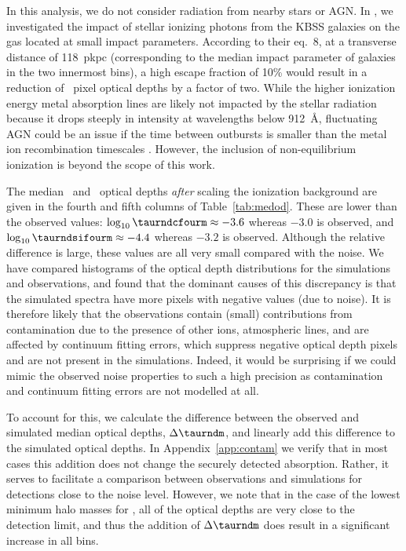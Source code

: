 \documentclass[useAMS,usenatbib,letterpaper]{mn2e}
\begin{document}
In this analysis, we do not consider radiation from 
nearby stars or AGN. In \citet{turner15}, we investigated the impact
of stellar ionizing photons from the KBSS galaxies 
on the gas located at small impact parameters.  According to their eq.~8,
at a transverse distance of 118~pkpc (corresponding to the median impact 
parameter of galaxies in the two innermost bins), 
a high escape fraction of 10\% would result in a reduction of \hone\ pixel optical depths
by a factor of two. While the higher ionization energy metal absorption lines are likely
not impacted by the stellar radiation because it drops steeply in intensity at wavelengths below 912~\AA, 
fluctuating AGN could be an issue if the time between outbursts is smaller than the metal ion 
recombination timescales \citep{oppenheimer13b, segers17}. However, the inclusion
of non-equilibrium ionization is beyond the scope of this work. 

The median \cfour\ and \sifour\ optical depths \textit{after} scaling
the ionization background are given in the fourth and fifth columns 
of Table~\ref{tab:medod}. 
These are lower than the 
observed values:
$\log_{10} \taurndcfourm \approx -3.6$ whereas $-3.0$ is observed,
and  $\log_{10} \taurndsifourm \approx -4.4$ whereas $-3.2$ is observed.
 Although the relative difference is large, these values are all very small compared with the noise.
We have compared histograms of the optical depth distributions for 
the simulations and observations, and found that the dominant causes of this 
discrepancy is that the simulated spectra have more pixels with 
negative values (due to noise). It is therefore likely that the observations
contain (small) contributions
from contamination due to the presence of other ions,
atmospheric lines, and are affected by continuum fitting errors, which suppress 
negative optical depth pixels and are not present in the simulations.
Indeed, it would be surprising if we could mimic the 
observed noise properties to such a high precision as contamination and
continuum fitting errors are not modelled at all. 

To account for this, we calculate the difference between
the observed and simulated median optical depths,  $\Delta \taurndm$,
and linearly add this difference to the simulated optical depths. 
In Appendix~\ref{app:contam} we verify that in most cases this addition does not change the securely
detected absorption. Rather, it serves to facilitate a
comparison between observations and simulations for detections close to the noise level. 
However, we note that in the case of the lowest minimum halo masses for \sifour, 
all of the optical depths are very close to the detection limit, 
and thus the addition of $\Delta \taurndm$ does result in a significant 
increase in all bins. 
\end{document}
